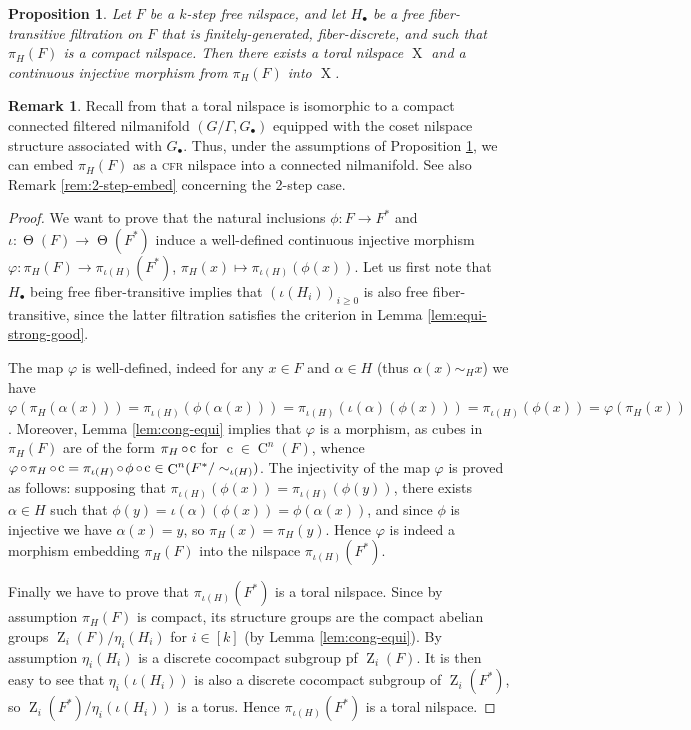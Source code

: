 \documentclass[a4paper,12pt,reqno]{amsart}
\newtheorem{proposition}[theorem]{Proposition}
\theoremstyle{definition}
\newtheorem{remark}[theorem]{Remark}
\def\to{\rightarrow}
\DeclareMathOperator{\ab}{Z}
\DeclareMathOperator{\tran}{\Theta}
\DeclareMathOperator{\q}{c}
\DeclareMathOperator{\ns}{X}
\DeclareMathOperator{\co}{\circ\hspace{-0.02 cm}}
\DeclareMathOperator{\cu}{C}
\begin{document}
\begin{proposition}\label{prop:embeb-strong-good}
Let $F$ be a $k$-step free nilspace, and let $H_\bullet$ be a free fiber-transitive filtration on $F$ that is finitely-generated, fiber-discrete, and such that $\pi_H(F)$ is a compact nilspace. Then there exists a toral nilspace $\ns$ and a continuous injective morphism from $\pi_H(F)$ into $\ns$.
\end{proposition}
\begin{remark}
Recall from \cite[Theorem 2.9.17]{Cand:Notes2} that a toral nilspace is isomorphic to a compact connected filtered nilmanifold $(G/\Gamma,G_\bullet)$ equipped with the coset nilspace structure associated with $G_\bullet$. Thus, under the assumptions of Proposition \ref{prop:embeb-strong-good}, we can embed $\pi_H(F)$ as a \textsc{cfr} nilspace into a connected nilmanifold. See also Remark \ref{rem:2-step-embed} concerning the  2-step case.
\end{remark}

\begin{proof}
We want to prove that the natural inclusions $\phi:F\to F^*$ and $\iota:\tran(F)\to \tran(F^*)$ induce a well-defined continuous injective morphism $\varphi:\pi_H(F) \to \pi_{\iota(H)}(F^*)$, $\pi_H(x)\mapsto \pi_{\iota(H)}(\phi(x))$. Let us first note that $H_\bullet$ being free fiber-transitive implies that $(\iota(H_i))_{i\geq 0}$ is also free fiber-transitive, since the latter filtration satisfies the criterion in Lemma \ref{lem:equi-strong-good}.

The map $\varphi$ is well-defined, indeed for any $x\in F$ and $\alpha\in H$ (thus $\alpha(x)\sim_H x$) we have  $\varphi(\pi_H(\alpha(x)))=\pi_{\iota(H)}(\phi(\alpha(x)))=\pi_{\iota(H)}(\iota(\alpha)(\phi(x)))=\pi_{\iota(H)}(\phi(x))=\varphi(\pi_H(x))$. Moreover, Lemma \ref{lem:cong-equi} implies that $\varphi$ is a morphism, as cubes in $\pi_H(F)$ are of the form $\pi_H\co  \q$ for $\q\in \cu^n(F)$, whence $\varphi\co \pi_H\co \q = \pi_{\iota(H)}\co \phi\co \q\in \cu^n(F^*/\sim_{\iota(H)})$. The injectivity of the map $\varphi$ is proved as follows: supposing that $\pi_{\iota(H)}(\phi(x)) = \pi_{\iota(H)}(\phi(y))$, there exists $\alpha\in H$ such that $\phi(y)=\iota(\alpha)(\phi(x))= \phi(\alpha(x))$, and since $\phi$ is injective we have $\alpha(x)=y$, so $\pi_H(x)=\pi_H(y)$. Hence $\varphi$ is indeed a morphism  embedding $\pi_H(F)$ into the nilspace $\pi_{\iota(H)}(F^*)$.

Finally we have to prove that $\pi_{\iota(H)}(F^*)$ is a toral nilspace. Since by assumption $\pi_H(F)$ is compact, its structure groups are the compact abelian groups $\ab_i(F)/\eta_i(H_i)$ for $i\in[k]$ (by Lemma \ref{lem:cong-equi}). By  assumption $\eta_i(H_i)$ is a discrete cocompact subgroup pf $\ab_i(F)$. It is then easy to see that $\eta_i(\iota(H_i))$ is also a discrete cocompact subgroup of $\ab_i(F^*)$, so $\ab_i(F^*)/\eta_i(\iota(H_i))$ is a torus. Hence $\pi_{\iota(H)}(F^*)$ is a toral nilspace.
\end{proof}
\end{document}
